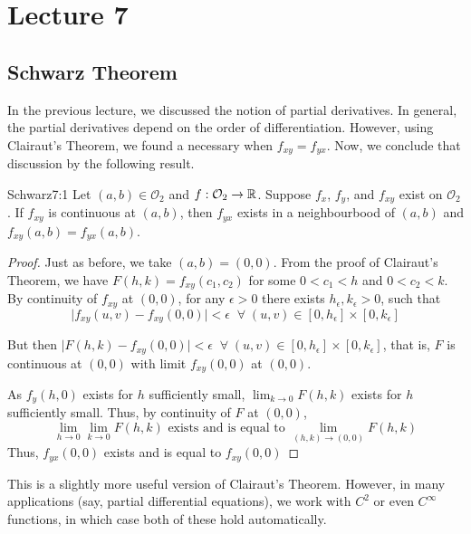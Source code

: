 \documentclass[../Analysis-3.tex]{subfiles}
\begin{document}
\chapter*{Lecture 7} %
\setcounter{chapter}{7} %
\setcounter{section}{0}
\setcounter{equation}{0}
\setcounter{figure}{0}


\section{Schwarz Theorem}

In the previous lecture, we discussed the notion of partial derivatives. In general, the partial derivatives depend on the order of differentiation. However, using Clairaut's Theorem, we found a necessary when $f_{xy} = f_{yx}$. Now, we conclude that discussion by the following result.

\begin{Thm}{Schwarz}{7:1}
  Let $(a,b) \in \mathcal{O}_2$ and $f:\mathcal{O}_2 \to \mathbb{R}$. Suppose $f_x$, $f_y$, and $f_{xy}$ exist on $\mathcal{O}_2$. If $f_{xy}$ is continuous at $(a,b)$, then $f_{yx}$ exists in a neighbourbood of $(a,b)$ and $f_{xy}(a,b) = f_{yx}(a,b)$.
\end{Thm}

\begin{proof}
  Just as before, we take $(a,b) = (0,0)$. From the proof of Clairaut's Theorem, we have $F(h,k) = f_{xy}(c_1, c_2)$ for some $0 < c_1< h$ and $0 < c_2 < k$. By continuity of $f_{xy}$ at $(0,0)$, for any $\epsilon >0$ there exists $h_\epsilon, k_\epsilon > 0$, such that
  \[
    \mid f_{xy}(u,v)- f_{xy}(0,0)\mid < \epsilon \;\;\forall \; (u,v) \in [0,h_\epsilon]\times[0,k_\epsilon]
  \]

  But then $\mid F(h,k) - f_{xy}(0,0) \mid < \epsilon \;\;\forall \; (u,v) \in [0,h_\epsilon]\times[0,k_\epsilon]$, that is, $F$ is continuous at $(0,0)$ with limit $f_{xy}(0,0)$ at $(0,0)$.

  As $f_y(h,0)$ exists for $h$ sufficiently small, $\lim_{k \to 0} F(h,k)$ exists for $h$ sufficiently small. Thus, by continuity of $F$ at $(0,0)$,
  \[\lim_{h \to 0}\lim_{k \to 0} F(h,k) \text{  exists and is equal to  }\lim_{(h,k) \to (0,0)} F(h,k)\]
  Thus, $f_{yx}(0,0)$ exists and is equal to $f_{xy}(0,0)$
\end{proof}

\msk

This is a slightly more useful version of Clairaut's Theorem. However, in many applications (say, partial differential equations), we work with $C^2$ or even $C^\infty$ functions, in which case both of these hold automatically.
\end{document}
